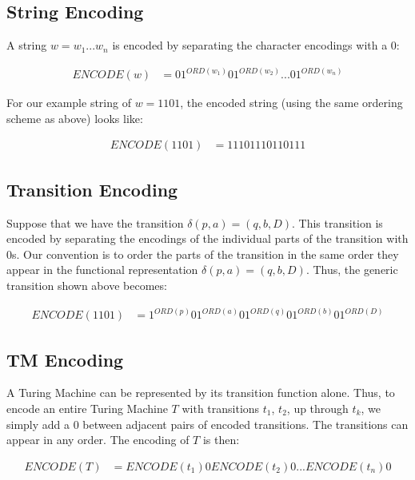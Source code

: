 \documentclass{article}
\begin{document}
\subsection*{String Encoding}
A string $w=w_1...w_n$ is encoded by separating the character encodings with a $0$:

\begin{align}
ENCODE(w)&=01^{ORD(w_1)}01^{ORD(w_2)}...01^{ORD(w_n)}
\end{align}

\noindent For our example string of $w=1101$, the encoded string (using the same ordering scheme
as above) looks like:

\begin{align}
ENCODE(1101)&=11101110110111\end{align}

\subsection*{Transition Encoding}

Suppose that we have the transition $\delta(p, a) = (q, b, D)$. This transition is encoded by separating the encodings of the individual parts of the transition with 0s. Our convention is to order the parts of the transition in the same order they appear in the functional representation $\delta(p, a) = (q, b, D)$. Thus, the generic transition shown above becomes:

\begin{align}
ENCODE(1101)&=1^{ORD(p)}01^{ORD(a)}01^{ORD(q)}01^{ORD(b)}01^{ORD(D)}\end{align}



\subsection*{TM Encoding}
A Turing Machine can be represented by its transition function alone. Thus, to encode an entire Turing Machine $T$ with transitions $t_1$, $t_2$, up through $t_k$, we simply add a $0$ between adjacent pairs of encoded transitions. The transitions can appear in any order. The encoding of $T$ is then:

\begin{align}
ENCODE(T)&=ENCODE(t_1)0ENCODE(t_2)0...ENCODE(t_n)0
\end{align}
\end{document}
